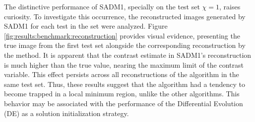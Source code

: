 			The distinctive performance of SADM1, specially on the test set $\chi=1$, raises curiosity. To investigate this occurrence, the reconstructed images generated by SADM1 for each test in the set were analyzed. Figure \ref{fig:results:benchmark:reconstruction} provides visual evidence, presenting the true image from the first test set alongside the corresponding reconstruction by the method. It is apparent that the contrast estimate in SADM1's reconstruction is much higher than the true value, nearing the maximum limit of the contrast variable. This effect persists across all reconstructions of the algorithm in the same test set. Thus, these results suggest that the algorithm had a tendency to become trapped in a local minimum region, unlike the other algorithms. This behavior may be associated with the performance of the Differential Evolution (DE) as a solution initialization strategy.
		
